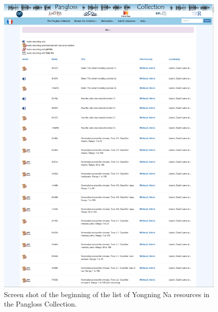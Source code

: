 \begin{figure}%
	\includegraphics[width=\textwidth]{figures/AutoList.png}
	\caption{Screen shot of the beginning of the list of Yongning Na resources in the Pangloss Collection.}
	\label{fig:autolist}
\end{figure}

